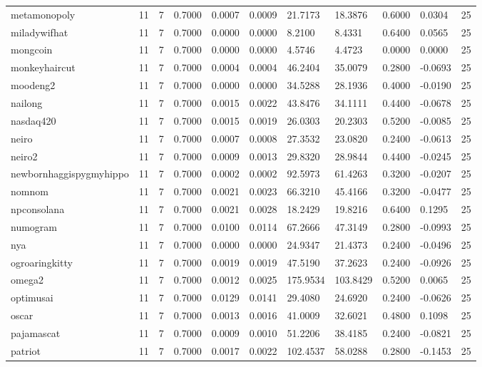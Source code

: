 \begin{table}[htbp]
\begin{tabular}{lllllllllll}
metamonopoly & 11 & 7 & 0.7000 & 0.0007 & 0.0009 & 21.7173 & 18.3876 & 0.6000 & 0.0304 & 25 \\
miladywifhat & 11 & 7 & 0.7000 & 0.0000 & 0.0000 & 8.2100 & 8.4331 & 0.6400 & 0.0565 & 25 \\
mongcoin & 11 & 7 & 0.7000 & 0.0000 & 0.0000 & 4.5746 & 4.4723 & 0.0000 & 0.0000 & 25 \\
monkeyhaircut & 11 & 7 & 0.7000 & 0.0004 & 0.0004 & 46.2404 & 35.0079 & 0.2800 & -0.0693 & 25 \\
moodeng2 & 11 & 7 & 0.7000 & 0.0000 & 0.0000 & 34.5288 & 28.1936 & 0.4000 & -0.0190 & 25 \\
nailong & 11 & 7 & 0.7000 & 0.0015 & 0.0022 & 43.8476 & 34.1111 & 0.4400 & -0.0678 & 25 \\
nasdaq420 & 11 & 7 & 0.7000 & 0.0015 & 0.0019 & 26.0303 & 20.2303 & 0.5200 & -0.0085 & 25 \\
neiro & 11 & 7 & 0.7000 & 0.0007 & 0.0008 & 27.3532 & 23.0820 & 0.2400 & -0.0613 & 25 \\
neiro2 & 11 & 7 & 0.7000 & 0.0009 & 0.0013 & 29.8320 & 28.9844 & 0.4400 & -0.0245 & 25 \\
newbornhaggispygmyhippo & 11 & 7 & 0.7000 & 0.0002 & 0.0002 & 92.5973 & 61.4263 & 0.3200 & -0.0207 & 25 \\
nomnom & 11 & 7 & 0.7000 & 0.0021 & 0.0023 & 66.3210 & 45.4166 & 0.3200 & -0.0477 & 25 \\
npconsolana & 11 & 7 & 0.7000 & 0.0021 & 0.0028 & 18.2429 & 19.8216 & 0.6400 & 0.1295 & 25 \\
numogram & 11 & 7 & 0.7000 & 0.0100 & 0.0114 & 67.2666 & 47.3149 & 0.2800 & -0.0993 & 25 \\
nya & 11 & 7 & 0.7000 & 0.0000 & 0.0000 & 24.9347 & 21.4373 & 0.2400 & -0.0496 & 25 \\
ogroaringkitty & 11 & 7 & 0.7000 & 0.0019 & 0.0019 & 47.5190 & 37.2623 & 0.2400 & -0.0926 & 25 \\
omega2 & 11 & 7 & 0.7000 & 0.0012 & 0.0025 & 175.9534 & 103.8429 & 0.5200 & 0.0065 & 25 \\
optimusai & 11 & 7 & 0.7000 & 0.0129 & 0.0141 & 29.4080 & 24.6920 & 0.2400 & -0.0626 & 25 \\
oscar & 11 & 7 & 0.7000 & 0.0013 & 0.0016 & 41.0009 & 32.6021 & 0.4800 & 0.1098 & 25 \\
pajamascat & 11 & 7 & 0.7000 & 0.0009 & 0.0010 & 51.2206 & 38.4185 & 0.2400 & -0.0821 & 25 \\
patriot & 11 & 7 & 0.7000 & 0.0017 & 0.0022 & 102.4537 & 58.0288 & 0.2800 & -0.1453 & 25 \\

\end{tabular}
\end{table}
